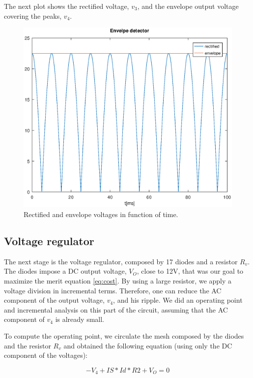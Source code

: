 The next plot shows the rectified voltage, $v_3$, and the envelope output voltage covering the peaks, $v_4$. 

\begin{figure}[H] \centering
\includegraphics[width=0.8 \linewidth]{venvlope.eps}
\caption{Rectified and envelope voltages in function of time.}
\label{fig:env}
\end{figure}

\subsection{Voltage regulator}
\label{subsec:reg}

\par The next stage is the voltage regulator, composed by 17 diodes and a resistor $R_v$. The diodes impose a DC output voltage, $V_O$, close to 12V, that was our goal to maximize the merit equation \ref{eq:cost}. By using a large resistor, we apply a voltage division in incremental terms. Therefore, one can reduce the AC component of the output voltage, $v_4$, and his ripple. We did an operating point and incremental analysis on this part of the circuit, assuming that the AC component of $v_4$ is already small.

\par To compute the operating point, we circulate the mesh composed by the diodes and the resistor $R_v$ and obtained the following equation (using only the DC component of the voltages):

\begin{equation}
 -V_4+IS*Id*R2+V_O=0
  \label{eq:reg_mesh}
\end{equation}
 
